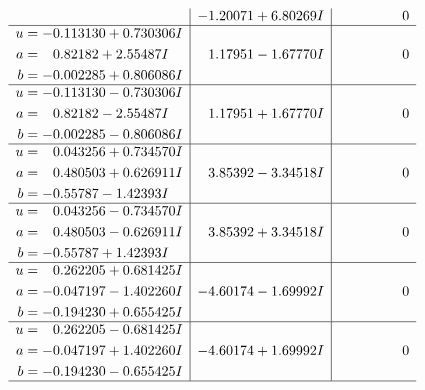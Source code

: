 \documentclass[1p]{elsarticle_modified}
\theoremstyle{definition}
\begin{document}
$$\begin{array}{c|c|c}
 & -1.20071 + 6.80269 I & \phantom{-0.000000 } 0 \\ \hline\begin{aligned}
u &= -0.113130 + 0.730306 I \\
a &= \phantom{-}0.82182 + 2.55487 I \\
b &= -0.002285 + 0.806086 I\end{aligned}
 & \phantom{-}1.17951 - 1.67770 I & \phantom{-0.000000 } 0 \\ \hline\begin{aligned}
u &= -0.113130 - 0.730306 I \\
a &= \phantom{-}0.82182 - 2.55487 I \\
b &= -0.002285 - 0.806086 I\end{aligned}
 & \phantom{-}1.17951 + 1.67770 I & \phantom{-0.000000 } 0 \\ \hline\begin{aligned}
u &= \phantom{-}0.043256 + 0.734570 I \\
a &= \phantom{-}0.480503 + 0.626911 I \\
b &= -0.55787 - 1.42393 I\end{aligned}
 & \phantom{-}3.85392 - 3.34518 I & \phantom{-0.000000 } 0 \\ \hline\begin{aligned}
u &= \phantom{-}0.043256 - 0.734570 I \\
a &= \phantom{-}0.480503 - 0.626911 I \\
b &= -0.55787 + 1.42393 I\end{aligned}
 & \phantom{-}3.85392 + 3.34518 I & \phantom{-0.000000 } 0 \\ \hline\begin{aligned}
u &= \phantom{-}0.262205 + 0.681425 I \\
a &= -0.047197 - 1.402260 I \\
b &= -0.194230 + 0.655425 I\end{aligned}
 & -4.60174 - 1.69992 I & \phantom{-0.000000 } 0 \\ \hline\begin{aligned}
u &= \phantom{-}0.262205 - 0.681425 I \\
a &= -0.047197 + 1.402260 I \\
b &= -0.194230 - 0.655425 I\end{aligned}
 & -4.60174 + 1.69992 I & \phantom{-0.000000 } 0\\
 \hline 
 \end{array}$$\newpage$$\begin{array}{c|c|c}  

\end{array}$$
\end{document}

